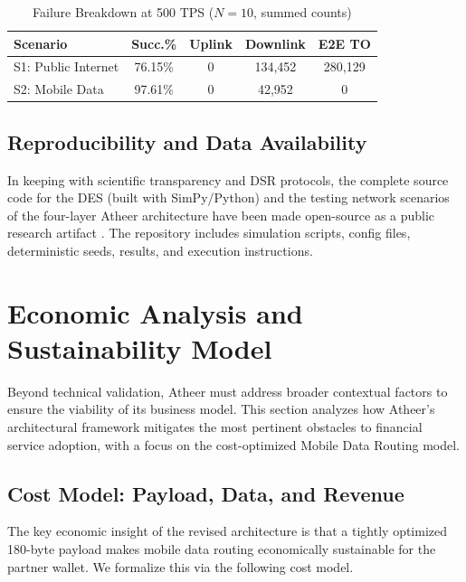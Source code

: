 \documentclass[conference,10pt]{IEEEtran}
\begin{document}
\begin{table}[t]
\caption{Failure Breakdown at 500 TPS ($N=10$, summed counts)}
\label{tab:failures}
\centering
\footnotesize
\begin{tabular}{@{}lcccc@{}}
\toprule
\textbf{Scenario} & \textbf{Succ.\%} & \textbf{Uplink} & \textbf{Downlink} & \textbf{E2E TO} \\
\midrule
S1: Public Internet & 76.15\% & 0 & 134{,}452 & 280{,}129 \\
S2: Mobile Data & 97.61\% & 0 & 42{,}952 & 0 \\
\bottomrule
\end{tabular}
\end{table}

\subsection{Reproducibility and Data Availability}

In keeping with scientific transparency and DSR protocols, the complete source code for the DES (built with SimPy/Python) and the testing network scenarios of the four-layer Atheer architecture have been made open-source as a public research artifact \cite{mutawakel2024}. The repository includes simulation scripts, config files, deterministic seeds, results, and execution instructions.

\section{Economic Analysis and Sustainability Model}
\label{sec:economic}

Beyond technical validation, Atheer must address broader contextual factors to ensure the viability of its business model. This section analyzes how Atheer's architectural framework mitigates the most pertinent obstacles to financial service adoption, with a focus on the cost-optimized Mobile Data Routing model.

\subsection{Cost Model: Payload, Data, and Revenue}

The key economic insight of the revised architecture is that a tightly optimized 180-byte payload makes mobile data routing economically sustainable for the partner wallet. We formalize this via the following cost model.
\end{document}
